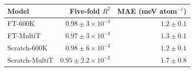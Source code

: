 \begin{tabular}{lrr}
\toprule
Model & Five-fold $R^2$ & MAE (meV atom$^{-1}$) \\
\midrule
FT-600K & $0.98\pm3\times10^{-3}$ & $1.2\pm0.1$ \\
FT-MultiT & $0.97\pm3\times10^{-3}$ & $1.3\pm0.1$ \\
Scratch-600K & $0.98\pm6\times10^{-3}$ & $1.2\pm0.1$ \\
Scratch-MultiT & $0.95\pm2.2\times10^{-2}$ & $1.7\pm0.8$ \\
\bottomrule
\end{tabular}
